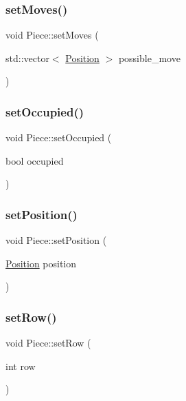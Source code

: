 \mbox{\label{class_piece_ad63e838ac5edfe8abab7211fc79e5a82}} 
\subsubsection{\texorpdfstring{set\+Moves()}{setMoves()}}
{\footnotesize\ttfamily void Piece\+::set\+Moves (\begin{DoxyParamCaption}\item[{std\+::vector$<$ \hyperlink{struct_position}{Position} $>$}]{possible\+\_\+move }\end{DoxyParamCaption})}

\mbox{\label{class_piece_aad0fbfd687db57c60b5b4585b67f387d}} 
\subsubsection{\texorpdfstring{set\+Occupied()}{setOccupied()}}
{\footnotesize\ttfamily void Piece\+::set\+Occupied (\begin{DoxyParamCaption}\item[{bool}]{occupied }\end{DoxyParamCaption})}

\mbox{\label{class_piece_a459865f830ff8c199cfca49f5d89b806}} 
\subsubsection{\texorpdfstring{set\+Position()}{setPosition()}}
{\footnotesize\ttfamily void Piece\+::set\+Position (\begin{DoxyParamCaption}\item[{\hyperlink{struct_position}{Position}}]{position }\end{DoxyParamCaption})}

\mbox{\label{class_piece_a604cbeae62b4358425d046bc5d737a39}} 
\subsubsection{\texorpdfstring{set\+Row()}{setRow()}}
{\footnotesize\ttfamily void Piece\+::set\+Row (\begin{DoxyParamCaption}\item[{int}]{row }\end{DoxyParamCaption})}



